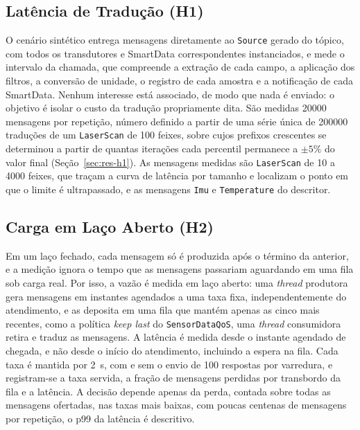 \documentclass[
    12pt,
    oneside,
    a4paper,
    chapter=TITLE,
    section=TITLE,
    english,
    brazil
]{abntex2}
\begin{document}
\subsection{Latência de Tradução (H1)}
O cenário sintético entrega mensagens diretamente ao \texttt{Source}
gerado do tópico, com todos os transdutores e SmartData correspondentes
instanciados, e mede o intervalo da chamada, que compreende a extração de
cada campo, a aplicação dos filtros, a conversão de unidade, o registro de
cada amostra e a notificação de cada SmartData. Nenhum interesse está
associado, de modo que nada é enviado: o objetivo é isolar o custo da
tradução propriamente dita. São medidas \num{20000} mensagens por
repetição, número definido a partir de uma série única de \num{200000}
traduções de um \texttt{LaserScan} de 100 feixes, sobre cujos prefixos
crescentes se determinou a partir de quantas iterações cada percentil
permanece a $\pm 5\%$ do valor final (Seção~\ref{sec:res-h1}). As
mensagens medidas são \texttt{LaserScan} de 10 a \num{4000} feixes, que
traçam a curva de latência por tamanho e localizam o ponto em que o
limite é ultrapassado, e as mensagens \texttt{Imu} e \texttt{Temperature}
do descritor.

\subsection{Carga em Laço Aberto (H2)}
Em um laço fechado, cada mensagem só é produzida após o término da
anterior, e a medição ignora o tempo que as mensagens passariam
aguardando em uma fila sob carga real. Por isso, a vazão é medida em laço
aberto: uma \textit{thread} produtora gera mensagens em instantes
agendados a uma taxa fixa, independentemente do atendimento, e as deposita
em uma fila que mantém apenas as cinco mais recentes, como a política
\textit{keep last} do \texttt{SensorDataQoS}, uma \textit{thread}
consumidora retira e traduz as mensagens. A latência é medida desde o
instante agendado de chegada, e não desde o início do atendimento,
incluindo a espera na fila. Cada taxa é mantida por \SI{2}{\second}, com e
sem o envio de 100 respostas por varredura, e registram-se a taxa servida,
a fração de mensagens perdidas por transbordo da fila e a latência. A
decisão depende apenas da perda, contada sobre todas as mensagens
ofertadas, nas taxas mais baixas, com poucas centenas de mensagens por
repetição, o p99 da latência é descritivo.
\end{document}
